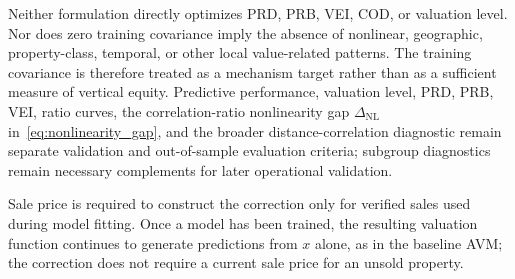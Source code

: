 \documentclass[10pt]{article}
\theoremstyle{definition}
\newcommand{\1}{\mathbf{1}}
\newcommand{\oldtext}[1]{\textcolor{blue}{\sout{#1}}}
\begin{document}


{\color{impGreen}Neither formulation directly optimizes PRD, PRB, VEI, COD, or valuation level. Nor does zero training covariance imply the absence of nonlinear, geographic, property-class, temporal, or other local value-related patterns. The training covariance is therefore treated as a mechanism target rather than as a sufficient measure of vertical equity. Predictive performance, valuation level, PRD, PRB, VEI, ratio curves, the correlation-ratio nonlinearity gap $\Delta_{\mathrm{NL}}$ in~\eqref{eq:nonlinearity_gap}, and the broader distance-correlation diagnostic remain separate validation and out-of-sample evaluation criteria; subgroup diagnostics remain necessary complements for later operational validation.}

{Sale price is required to construct the correction only for verified sales used during model fitting. Once a model has been trained, the resulting valuation function continues to generate predictions from $x$ alone, as in the baseline AVM; the correction does not require a current sale price for an unsold property.}
\end{document}
